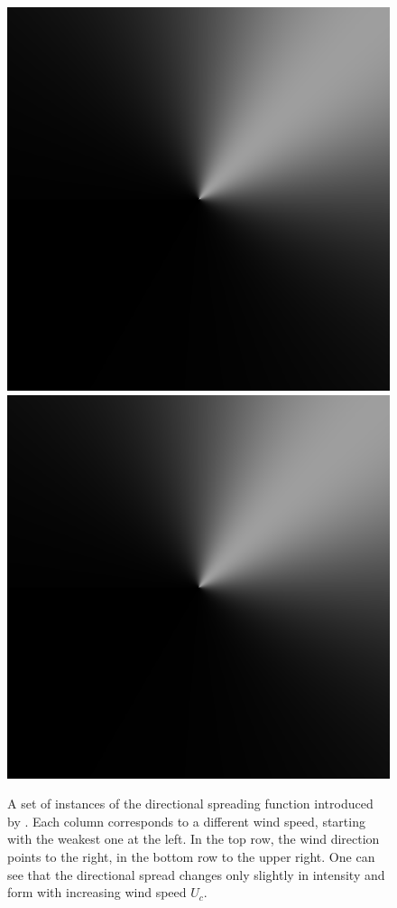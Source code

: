 \begin{figure}[p]
{ }
 \hfill
 \subtop
 {
 \includegraphics[scale=0.25]{figures/donelan_dfilt_wur_sqrt50.png}
 }
 \hfill
 \subtop
 {
 \includegraphics[scale=0.25]{figures/donelan_dfilt_wur_sqrt200.png}
 }
\caption[The directional spreading function as introduced by
\citet{article:Donelan1985}.]{
A set of instances of the directional spreading function introduced by
\citet{article:Donelan1985}. Each column 
corresponds to a different wind speed, starting with the weakest one at the 
left. In the top row, the wind direction points to the right, in the bottom row 
to the upper right. 
One can see that the directional spread changes only slightly in intensity and
form with increasing wind speed $U_{c}$.}
\label{fig:donelan_directional_filter}
\end{figure}
